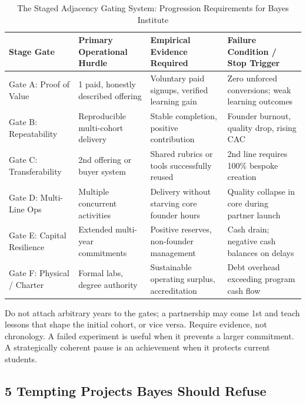 \begin{table}[t]
\centering
\small
\caption{The Staged Adjacency Gating System: Progression Requirements for Bayes Institute}
\label{tab:bayes_staged_gating}
\begin{tabularx}{\textwidth}{l p{3.2cm} p{3.8cm} X}
\toprule
\textbf{Stage Gate} & \textbf{Primary Operational Hurdle} & \textbf{Empirical Evidence Required} & \textbf{Failure Condition / Stop Trigger} \\
\midrule
Gate A: Proof of Value & 1 paid, honestly described offering & Voluntary paid signups, verified learning gain & Zero unforced conversions; weak learning outcomes \\
\addlinespace[2pt]
Gate B: Repeatability & Reproducible multi-cohort delivery & Stable completion, positive contribution & Founder burnout, quality drop, rising CAC \\
\addlinespace[2pt]
Gate C: Transferability & 2nd offering or buyer system & Shared rubrics or tools successfully reused & 2nd line requires 100\% bespoke creation \\
\addlinespace[2pt]
Gate D: Multi-Line Ops & Multiple concurrent activities & Delivery without starving core founder hours & Quality collapse in core during partner launch \\
\addlinespace[2pt]
Gate E: Capital Resilience & Extended multi-year commitments & Positive reserves, non-founder management & Cash drain; negative cash balances on delays \\
\addlinespace[2pt]
Gate F: Physical / Charter & Formal labs, degree authority & Sustainable operating surplus, accreditation & Debt overhead exceeding program cash flow \\
\bottomrule
\end{tabularx}
\end{table}

Do not attach arbitrary years to the gates; a partnership may come 1st and teach lessons that shape the initial cohort, or vice versa. Require evidence, not chronology. A failed experiment is useful when it prevents a larger commitment. A strategically coherent pause is an achievement when it protects current students.

\subsection{5 Tempting Projects Bayes Should Refuse}
\label{sec:five_tempting_projects_bayes_must_refuse}

